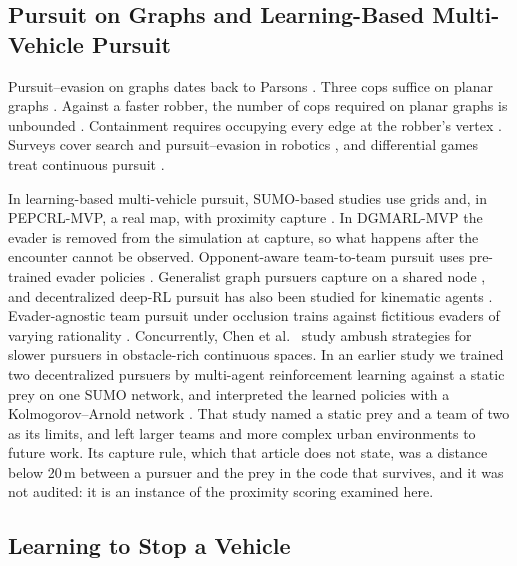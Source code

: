 \documentclass[5p,twocolumn]{elsarticle}
\begin{document}
\subsection{Pursuit on Graphs and Learning-Based Multi-Vehicle Pursuit}

Pursuit--evasion on graphs dates back to Parsons \cite{parsons1978}. Three cops suffice on planar graphs
\cite{aigner1984}. Against a faster robber, the number of cops required on planar graphs is unbounded
\cite{fomin2010}. Containment requires occupying every edge at the robber's vertex \cite{crytser2020}. Surveys cover
search and pursuit--evasion in robotics \cite{chung2011}, and differential games treat continuous pursuit
\cite{isaacs1965}.

In learning-based multi-vehicle pursuit, SUMO-based studies use grids and, in PEPCRL-MVP, a real map, with proximity
capture \cite{li2024pepcrl,li2023dgmarl,yang2022gradedq}. In DGMARL-MVP the evader is removed from the simulation at
capture, so what happens after the encounter cannot be observed. Opponent-aware team-to-team pursuit uses pre-trained
evader policies \cite{wang2022opponent}. Generalist graph pursuers capture on a shared node
\cite{li2024grasper,lu2025equilibrium}, and decentralized deep-RL pursuit has also been studied for kinematic agents
\cite{desouza2021}. Evader-agnostic team pursuit under occlusion trains against fictitious evaders of varying
rationality \cite{kalanther2025evader}. Concurrently, Chen et al.\ \cite{chen2026ambush} study ambush strategies for
slower pursuers in obstacle-rich continuous spaces. In an earlier study we trained two decentralized pursuers by
multi-agent reinforcement learning against a static prey on one SUMO network, and interpreted the learned policies
with a Kolmogorov--Arnold network \cite{noguera2025kan}. That study named a static prey and a team of two
as its limits, and left larger teams and more complex urban environments to future work. Its capture rule, which that article does not state, was a distance below 20\,m between a
pursuer and the prey in the code that survives, and it was not audited: it is an instance of the proximity scoring
examined here.

\subsection{Learning to Stop a Vehicle}
\end{document}
